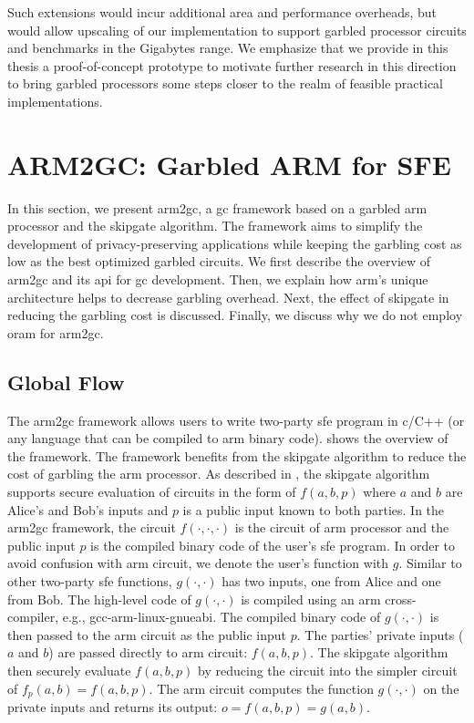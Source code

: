 Such extensions would incur additional area and performance overheads, but would allow upscaling of our implementation to support garbled processor circuits and benchmarks in the Gigabytes range.
We emphasize that we provide in this thesis a proof-of-concept prototype to motivate further research in this direction to bring garbled processors some steps closer to the realm of feasible practical implementations.

\section{ARM2GC: Garbled ARM for SFE}\label{sec:processor-arm}
In this section, we present \gls{arm2gc}, a \acrshort{gc} framework based on a garbled \gls{arm} processor and the \gls{skipgate} algorithm.
The framework aims to simplify the development of privacy-preserving applications while keeping the garbling cost as low as the best optimized garbled circuits.
We first describe the overview of \gls{arm2gc} and its \acrshort{api} for \acrshort{gc} development.
Then, we explain how \gls{arm}'s unique architecture helps to decrease garbling overhead.
Next, the effect of \gls{skipgate} in reducing the garbling cost is discussed.
Finally, we discuss why we do not employ \acrshort{oram} for \gls{arm2gc}.

\subsection{Global Flow}\label{ssec:arm-global}
The \gls{arm2gc} framework allows users to write two-party \acrshort{sfe} program in \gls{c}/C++ (or any language that can be compiled to \gls{arm} binary code).
 shows the overview of the framework.
The framework benefits from the \gls{skipgate} algorithm to reduce the cost of garbling the \gls{arm} processor.
As described in , the \gls{skipgate} algorithm supports secure evaluation of circuits in the form of $f(a,b,p)$ where $a$ and $b$ are Alice's and Bob's inputs and $p$ is a public input known to both parties.
In the \gls{arm2gc} framework, the circuit $f(\cdot,\cdot,\cdot)$ is the circuit of \gls{arm} processor and the public input $p$ is the compiled binary code of the user's \acrshort{sfe} program.
In order to avoid confusion with \gls{arm} circuit, we denote the user's function with $g$.
Similar to other two-party \acrshort{sfe} functions, $g(\cdot,\cdot)$ has two inputs, one from Alice and one from Bob.
The high-level code of $g(\cdot,\cdot)$ is compiled using an \gls{arm} cross-compiler, e.g., gcc-arm-linux-gnueabi.
The compiled binary code of $g(\cdot,\cdot)$ is then passed to the \gls{arm} circuit as the public input $p$.
The parties' private inputs ($a$ and $b$) are passed directly to \gls{arm} circuit: $f(a,b,p)$.
The \gls{skipgate} algorithm then securely evaluate $f(a,b,p)$ by reducing the circuit into the simpler circuit of $f_{p}(a,b) = f(a,b,p)$.
The \gls{arm} circuit computes the function $g(\cdot,\cdot)$ on the private inputs and returns its output: $o = f(a,b,p) = g(a,b)$.

